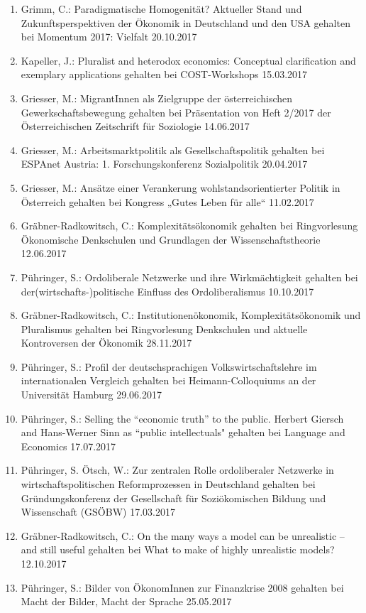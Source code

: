 \begin{enumerate}
	\item Grimm, C.: Paradigmatische Homogenität? Aktueller Stand und Zukunftsperspektiven der Ökonomik in Deutschland und den USA gehalten bei Momentum 2017: Vielfalt 20.10.2017
	\item Kapeller, J.: Pluralist and heterodox economics: Conceptual clarification and exemplary applications gehalten bei COST-Workshops 15.03.2017
	\item Griesser, M.: MigrantInnen als Zielgruppe der österreichischen Gewerkschaftsbewegung gehalten bei Präsentation von Heft 2/2017 der Österreichischen Zeitschrift für Soziologie 14.06.2017
	\item Griesser, M.: Arbeitsmarktpolitik als Gesellschaftspolitik gehalten bei ESPAnet Austria: 1. Forschungskonferenz Sozialpolitik 20.04.2017
	\item Griesser, M.: Ansätze einer Verankerung wohlstandsorientierter Politik in Österreich gehalten bei Kongress „Gutes Leben für alle“ 11.02.2017
	\item Gräbner-Radkowitsch, C.: Komplexitätsökonomik gehalten bei Ringvorlesung \glqq Ökonomische Denkschulen und Grundlagen der Wissenschaftstheorie\grqq{} 12.06.2017
	\item Pühringer, S.: Ordoliberale Netzwerke und ihre Wirkmächtigkeit gehalten bei der(wirtschafts-)politische Einfluss des Ordoliberalismus 10.10.2017
	\item Gräbner-Radkowitsch, C.: Institutionenökonomik, Komplexitätsökonomik und Pluralismus gehalten bei Ringvorlesung \glqq Denkschulen und aktuelle Kontroversen der Ökonomik\grqq{} 28.11.2017
	\item Pühringer, S.: Profil der deutschsprachigen Volkswirtschaftslehre im internationalen Vergleich gehalten bei Heimann-Colloquiums an der Universität Hamburg 29.06.2017
	\item Pühringer, S.: Selling the “economic truth” to the public. Herbert Giersch and Hans-Werner Sinn as “public intellectuals" gehalten bei Language and Economics 17.07.2017
	\item Pühringer, S. Ötsch, W.: Zur zentralen Rolle ordoliberaler Netzwerke in wirtschaftspolitischen Reformprozessen in Deutschland gehalten bei Gründungskonferenz der Gesellschaft für Soziökomischen Bildung und Wissenschaft (GSÖBW) 17.03.2017
	\item Gräbner-Radkowitsch, C.: On the many ways a model can be unrealistic – and still useful gehalten bei What to make of highly unrealistic models? 12.10.2017
	\item Pühringer, S.: Bilder von ÖkonomInnen zur Finanzkrise 2008 gehalten bei Macht der Bilder, Macht der Sprache 25.05.2017

\end{enumerate}
